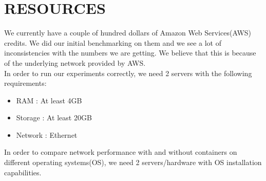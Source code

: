 \documentclass[letterpaper, 10 pt, conference]{ieeeconf}  %
\begin{document}
\section{RESOURCES}
We currently have a couple of hundred dollars of Amazon Web Services(AWS) credits. We did our initial benchmarking on them and we see a lot of inconsistencies with the numbers we are getting. We believe that this is because of the underlying network provided by AWS.\\
In order to run our experiments correctly, we need 2 servers with the following requirements:
\begin{itemize}
\item RAM : At least 4GB
\item Storage : At least 20GB
\item Network : Ethernet
\end{itemize}
In order to compare network performance with and without containers on different operating systems(OS), we need 2 servers/hardware with OS installation capabilities. 
\addtolength{\textheight}{-12cm}   %











\end{document}
